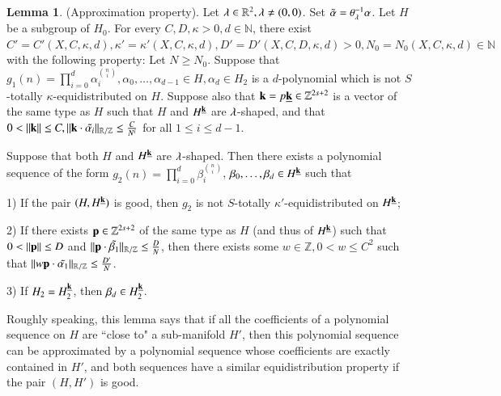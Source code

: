 \documentclass[12pt,amstex]{amsart}
\theoremstyle{definition}
\newtheorem{lem}[thm]{Lemma}
\def \A {\alpha}
\def \B {\beta}
\def \D {\kappa}
\def \k {\bold{k}}
\def \p {\bold{p}}
\def \l {\bold{\lambda}}
\begin{document}
\begin{lem}\label{appro2}(Approximation property).
Let $\l\in\mathbb{R}^{2}, \l\neq(0,0)$. Set $\tilde{\A}=\theta^{-1}_{\l}\A$.
Let $H$ be a subgroup of $H_{0}$. For every $C,D,\D>0, d\in\mathbb{N}$, there exist $C'=C'(X,C,\D,d), \D'=\D'(X,C,\D,d), D'=D'(X,C,D,\D,d)>0, N_{0}=N_{0}(X,C,\D,d)\in\mathbb{N}$ with the following property: Let $N\geq N_{0}$. Suppose that $g_{1}(n)=\prod_{i=0}^{d}\A_{i}^{\binom{n}{i}}, \A_{0},\dots,\A_{d-1}\in H, \A_{d}\in H_{2}$ is a $d$-polynomial which is not $S$-totally $\D$-equidistributed on $H$. Suppose also that
  $\k=p\underline{\k}\in\mathbb{Z}^{2s+2}$ is a vector of the same type as $H$ such that
   $H$ and $H^{\underline{\k}}$ are $\l$-shaped,
   and that
   $0<\Vert\k\Vert\leq C, \Vert\k\cdot\tilde{\A_{i}}\Vert_{\mathbb{R}/\mathbb{Z}}\leq\frac{C}{N^{i}}$ for all $1\leq i\leq d-1$.

  Suppose that both $H$ and $H^{\underline{\k}}$ are $\l$-shaped.
  Then there exists a polynomial sequence of the form $g_{2}(n)=\prod_{i=0}^{d}\B_{i}^{\binom{n}{i}}$, $\B_{0},\dots,\B_{d}\in H^{\underline{\k}}$ such that

  1) If the pair $(H,H^{\underline{\k}})$ is good, then $g_{2}$ is not $S$-totally $\D'$-equidistributed on $H^{\underline{\k}}$;

2) If there exists $\p\in\mathbb{Z}^{2s+2}$ of the same type as $H$ (and thus of $H^{\underline{\k}}$) such that $0<\Vert\p\Vert\leq D$ and $\Vert\p\cdot\tilde{\B_{1}}\Vert_{\mathbb{R}/\mathbb{Z}}\leq\frac{D}{N}$,
then there exists some $w\in\mathbb{Z}, 0<w\leq C^{2}$ such that $\Vert w\p\cdot\tilde{\A_{1}}\Vert_{\mathbb{R}/\mathbb{Z}}\leq\frac{D'}{N}$.

3) If $H_{2}=H_{2}^{\underline{\k}}$, then $\B_{d}\in H_{2}^{\underline{\k}}$.
\end{lem}
Roughly speaking, this lemma says that if all the coefficients of a polynomial sequence on $H$ are ``close to" a sub-manifold $H'$, then this polynomial sequence can be approximated by a polynomial sequence whose coefficients are exactly contained in $H'$, and both sequences have a similar equidistribution property if the pair $(H,H')$ is good.
\end{document}
